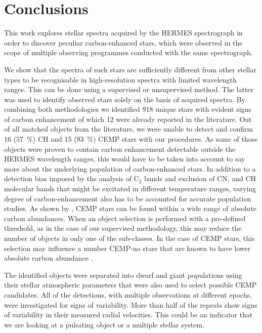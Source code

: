 \section{Conclusions}
\label{sec:summary_cemp}
This work explores stellar spectra acquired by the HERMES spectrograph in order to discover peculiar carbon-enhanced stars, which were observed in the scope of multiple observing programmes conducted with the same spectrograph.

We show that the spectra of such stars are sufficiently different from other stellar types to be recognisable in high-resolution spectra with limited wavelength ranges. This can be done using a supervised or unsupervised method. The latter was used to identify observed stars solely on the basis of acquired spectra. By combining both methodologies we identified 918 unique stars with evident signs of carbon enhancement of which 12 were already reported in the literature. Out of all matched objects from the literature, we were unable to detect and confirm 16 ($57$~\%) CH and 15 ($93$~\%) CEMP stars with our procedures. As some of those objects were proven to contain carbon enhancement detectable outside the HERMES wavelength ranges, this would have to be taken into account to say more about the underlying population of carbon-enhanced stars. In addition to a detection bias imposed by the analysis of C$_2$ bands and exclusion of CN, and CH molecular bands that might be excitated in different temperature ranges, varying degree of carbon-enhancement also has to be accounted for accurate population studies. As shown by \citet{2016ApJ...833...20Y}, CEMP stars can be found within a wide range of absolute carbon abundances. When an object selection is performed with a pre-defined threshold, as in the case of our supervised methodology, this may reduce the number of objects in only one of the sub-classes. In the case of CEMP stars, this selection may influence a number CEMP-no stars that are known to have lower absolute carbon abundance \cite{2016ApJ...833...20Y}.

The identified objects were separated into dwarf and giant populations using their stellar atmospheric parameters that were also used to select possible CEMP candidates. All of the detections, with multiple observations at different epochs, were investigated for signs of variability. More than half of the repeats show signs of variability in their measured radial velocities. This could be an indicator that we are looking at a pulsating object or a multiple stellar system.

